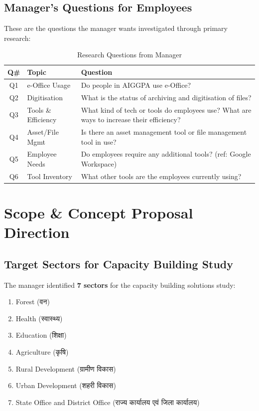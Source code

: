\documentclass[12pt,a4paper]{article}
\newcommand{\hindi}[1]{{\hindifont #1}}
\begin{document}
\subsection{Manager's Questions for Employees}

These are the questions the manager wants investigated through primary research:

\begin{table}[h!]
\centering
\caption{Research Questions from Manager}
\begin{tabularx}{\textwidth}{@{}clX@{}}
\toprule
\textbf{Q\#} & \textbf{Topic} & \textbf{Question} \\
\midrule
Q1 & e-Office Usage & Do people in AIGGPA use e-Office? \\
Q2 & Digitisation & What is the status of archiving and digitisation of files? \\
Q3 & Tools \& Efficiency & What kind of tech or tools do employees use? What are ways to increase their efficiency? \\
Q4 & Asset/File Mgmt & Is there an asset management tool or file management tool in use? \\
Q5 & Employee Needs & Do employees require any additional tools? (ref: Google Workspace) \\
Q6 & Tool Inventory & What other tools are the employees currently using? \\
\bottomrule
\end{tabularx}
\end{table}

\section{Scope \& Concept Proposal Direction}

\subsection{Target Sectors for Capacity Building Study}

The manager identified \textbf{7 sectors} for the capacity building solutions study:

\begin{enumerate}[label=\textbf{(\arabic*)}]
  \item Forest (\hindi{वन})
  \item Health (\hindi{स्वास्थ्य})
  \item Education (\hindi{शिक्षा})
  \item Agriculture (\hindi{कृषि})
  \item Rural Development (\hindi{ग्रामीण विकास})
  \item Urban Development (\hindi{शहरी विकास})
  \item State Office and District Office (\hindi{राज्य कार्यालय एवं जिला कार्यालय})
\end{enumerate}
\end{document}
